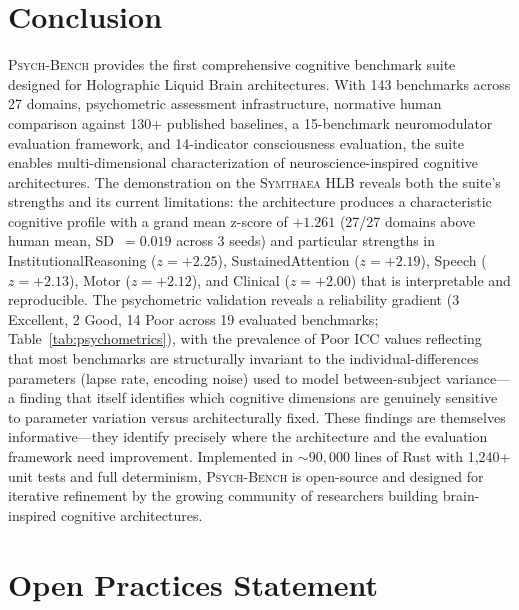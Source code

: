 \documentclass[11pt,letterpaper]{article}
\newcommand{\symthaea}{\textsc{Symthaea}}
\newcommand{\psychbench}{\textsc{Psych-Bench}}
\newcommand{\hlb}{\textsc{HLB}}
\begin{document}
\section{Conclusion}
\label{sec:conclusion}

\psychbench{} provides the first comprehensive cognitive benchmark suite designed for Holographic Liquid Brain architectures. With 143 benchmarks across 27 domains, psychometric assessment infrastructure, normative human comparison against 130+ published baselines, a 15-benchmark neuromodulator evaluation framework, and 14-indicator consciousness evaluation, the suite enables multi-dimensional characterization of neuroscience-inspired cognitive architectures. The demonstration on the \symthaea{} \hlb{} reveals both the suite's strengths and its current limitations: the architecture produces a characteristic cognitive profile with a grand mean z-score of $+1.261$ (27/27 domains above human mean, SD~$= 0.019$ across 3 seeds) and particular strengths in InstitutionalReasoning ($z = +2.25$), SustainedAttention ($z = +2.19$), Speech ($z = +2.13$), Motor ($z = +2.12$), and Clinical ($z = +2.00$) that is interpretable and reproducible. The psychometric validation reveals a reliability gradient (3 Excellent, 2 Good, 14 Poor across 19 evaluated benchmarks; Table~\ref{tab:psychometrics}), with the prevalence of Poor ICC values reflecting that most benchmarks are structurally invariant to the individual-differences parameters (lapse rate, encoding noise) used to model between-subject variance---a finding that itself identifies which cognitive dimensions are genuinely sensitive to parameter variation versus architecturally fixed. These findings are themselves informative---they identify precisely where the architecture and the evaluation framework need improvement. Implemented in ${\sim}90{,}000$ lines of Rust with 1,240+ unit tests and full determinism, \psychbench{} is open-source and designed for iterative refinement by the growing community of researchers building brain-inspired cognitive architectures.

\section*{Open Practices Statement}
\end{document}
